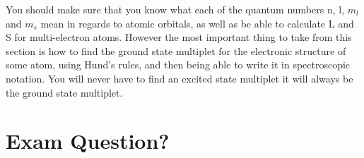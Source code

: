 You should make sure that you know what each of the quantum numbers n, l, $m_l$ and $m_s$ mean in regards to atomic orbitals, as well as be able to calculate L and S for multi-electron atoms. However the most important thing to take from this section is how to find the ground state multiplet for the electronic structure of some atom, using Hund's rules, and then being able to write it in spectroscopic notation. You will never have to find an excited state multiplet it will always be the ground state multiplet.


\section{Exam Question?}
